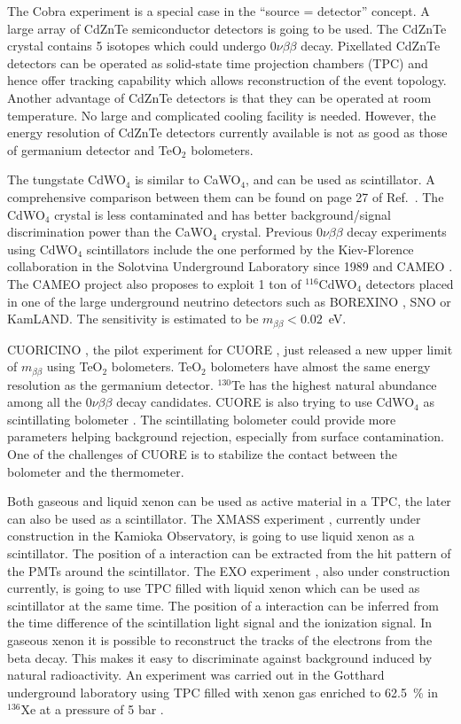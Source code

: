 The Cobra experiment \cite{Zub01, Ell02, Kie03} is a special case in
the ``source = detector'' concept. A large array of CdZnTe
semiconductor detectors is going to be used. The CdZnTe crystal
contains 5 isotopes which could undergo $0\nu\beta\beta$
decay. Pixellated CdZnTe detectors can be operated as solid-state time
projection chambers (TPC) and hence offer tracking capability which
allows reconstruction of the event topology. Another advantage of
CdZnTe detectors is that they can be operated at room temperature. No
large and complicated cooling facility is needed. However, the energy
resolution of CdZnTe detectors currently available is not as good as
those of germanium detector and TeO$_{2}$ bolometers.

The tungstate CdWO$_{4}$ is similar to CaWO$_{4}$, and can be used as
scintillator. A comprehensive comparison between them can be found on
page 27 of Ref.~\cite{Avi05}. The CdWO$_{4}$ crystal is less
contaminated and has better background/signal discrimination power
than the CaWO$_{4}$ crystal. Previous $0\nu\beta\beta$ decay
experiments using CdWO$_{4}$ scintillators include the one performed
by the Kiev-Florence collaboration in the Solotvina Underground
Laboratory since 1989 \cite{Dane00, Dan03} and CAMEO \cite{Bel00,
Bel01}. The CAMEO project also proposes to exploit 1 ton of
$^{116}$CdWO$_{4}$ detectors placed in one of the large underground
neutrino detectors such as BOREXINO \cite{Arp08}, SNO or KamLAND. The
sensitivity is estimated to be $m_{\beta\beta} < 0.02$~eV.

CUORICINO \cite{Pre04}, the pilot experiment for CUORE \cite{Arn04,
Ard05}, just released a new upper limit of $m_{\beta\beta}$
\cite{Arn08} using TeO$_{2}$ bolometers. TeO$_{2}$ bolometers have
almost the same energy resolution as the germanium
detector. $^{130}$Te has the highest natural abundance among all the
$0\nu\beta\beta$ decay candidates. CUORE is also trying to use
CdWO$_{4}$ as scintillating bolometer \cite{Gir08}. The scintillating
bolometer could provide more parameters helping background rejection,
especially from surface contamination. One of the challenges of CUORE
is to stabilize the contact between the bolometer and the thermometer.

Both gaseous and liquid xenon can be used as active material in a TPC,
the later can also be used as a scintillator. The XMASS experiment
\cite{Kim05}, currently under construction in the Kamioka Observatory,
is going to use liquid xenon as a scintillator. The position of a
interaction can be extracted from the hit pattern of the PMTs around
the scintillator. The EXO experiment \cite{Dani00}, also under
construction currently, is going to use TPC filled with liquid xenon
which can be used as scintillator at the same time. The position of a
interaction can be inferred from the time difference of the
scintillation light signal and the ionization signal. In gaseous xenon
it is possible to reconstruct the tracks of the electrons from the
beta decay. This makes it easy to discriminate against background
induced by natural radioactivity. An experiment was carried out in the
Gotthard underground laboratory using TPC filled with xenon gas
enriched to 62.5~\% in $^{136}$Xe at a pressure of 5 bar \cite{Lue98}.


